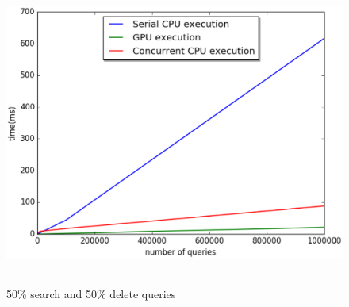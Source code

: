 \documentclass[MTech]{iitmdiss}
\begin{document}
\begin{figure}[H]
\centering 
\includegraphics[width=13cm,height=10cm]{s_i_d_50_0_50}
\caption{50\% search and 50\% delete queries}
\label{fig:sid_50_0_50}
\end{figure}
\end{document}
